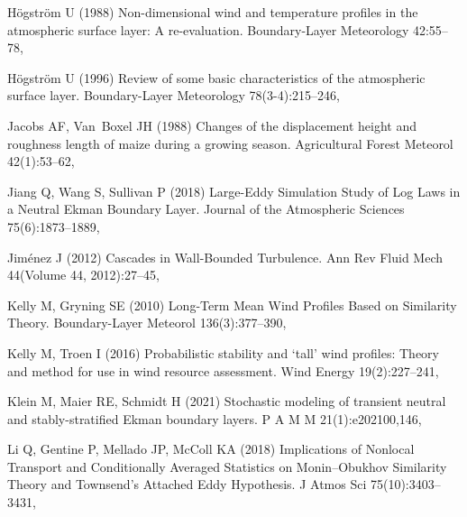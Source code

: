 \documentclass[smallcondensed,final]{svjour3}
\begin{document}
\begin{thebibliography}{57}
H{\"o}gstr{\"o}m U (1988) Non-dimensional wind and temperature profiles in the
  atmospheric surface layer: {{A}} re-evaluation. Boundary-Layer Meteorology
  42:55--78, 

H{\"o}gstr{\"o}m U (1996) Review of some basic characteristics of the
  atmospheric surface layer. Boundary-Layer Meteorology 78(3-4):215--246,

Jacobs AF, Van~Boxel JH (1988) Changes of the displacement height and roughness
  length of maize during a growing season. Agricultural Forest Meteorol
  42(1):53--62, 

Jiang Q, Wang S, Sullivan P (2018) Large-{{Eddy Simulation Study}} of {{Log
  Laws}} in a {{Neutral Ekman Boundary Layer}}. Journal of the Atmospheric
  Sciences 75(6):1873--1889, 

Jim{\'e}nez J (2012) Cascades in {{Wall-Bounded Turbulence}}. Ann Rev Fluid
  Mech 44(Volume 44, 2012):27--45, 

Kelly M, Gryning SE (2010) Long-{{Term Mean Wind Profiles Based}} on
  {{Similarity Theory}}. Boundary-Layer Meteorol 136(3):377--390,

Kelly M, Troen I (2016) Probabilistic stability and `tall' wind profiles:
  Theory and method for use in wind resource assessment. Wind Energy
  19(2):227--241, 

Klein M, Maier RE, Schmidt H (2021) Stochastic modeling of transient neutral
  and stably-stratified {{Ekman}} boundary layers. P A M M 21(1):e202100,146,

Li Q, Gentine P, Mellado JP, McColl KA (2018) Implications of {{Nonlocal
  Transport}} and {{Conditionally Averaged Statistics}} on {{Monin}}--{{Obukhov
  Similarity Theory}} and {{Townsend}}'s {{Attached Eddy Hypothesis}}. J Atmos
  Sci 75(10):3403--3431, 


\end{thebibliography}
\end{document}
